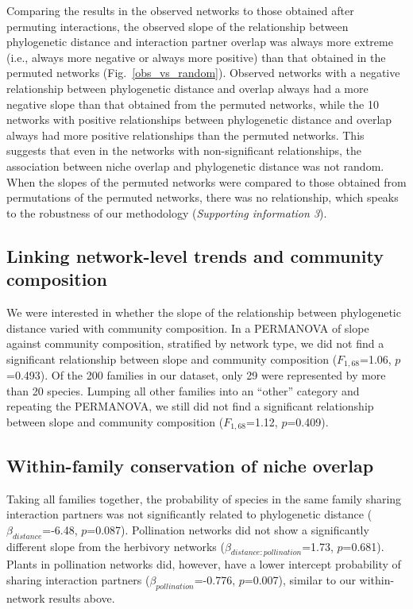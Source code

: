 \documentclass[12pt]{article}
\begin{document}
\begin{spacing}{1.5}
    Comparing the results in the observed networks to those obtained after 
    permuting interactions, the observed 
    slope of the relationship between phylogenetic distance and interaction 
    partner overlap was always more extreme (i.e., always more negative or 
    always more positive) than that obtained in the permuted networks (Fig.~\ref{obs_vs_random}).
    Observed networks with a negative relationship between phylogenetic distance 
    and overlap always had a more negative slope than that obtained from the 
    permuted networks, while the 10 networks with positive relationships 
    between phylogenetic distance and overlap always had more positive 
    relationships than the permuted networks. This suggests that even in 
    the networks with non-significant relationships, the association between niche overlap and 
    phylogenetic distance was not random. When the slopes of the permuted 
    networks were compared to those obtained from permutations of the 
    permuted networks, there was no relationship, which speaks to the robustness of our methodology (\emph{Supporting information 3}). 


  \subsection*{Linking network-level trends and community composition} 

    We were interested in whether the slope of the relationship between phylogenetic distance varied with community composition. In a PERMANOVA of slope against community composition, stratified by network type, we did not find a significant relationship between slope and community composition ($F_{1,68}$=1.06, $p$=0.493). Of the 200 families in our dataset, only 29 were represented by more than 20 species. Lumping all other families into an ``other'' category and repeating the PERMANOVA, we still did not find a significant relationship between slope and community composition ($F_{1,68}$=1.12, $p$=0.409). 


  \subsection*{Within-family conservation of niche overlap} 

    Taking all families together, the probability of species in the same family sharing interaction partners was not significantly related to phylogenetic distance ($\beta_{distance}$=-6.48, $p$=0.087). Pollination networks did not show a significantly different slope from the herbivory networks ($\beta_{distance:pollination}$=1.73, $p$=0.681). Plants in pollination networks did, however, have a lower intercept probability of sharing interaction partners ($\beta_{pollination}$=-0.776, $p$=0.007), similar to our within-network results above.



\end{spacing}
\end{document}
